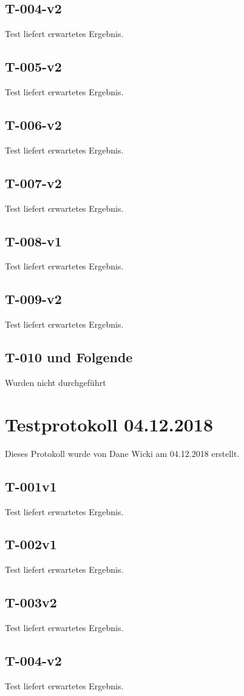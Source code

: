\documentclass[a4paper]{scrreprt}
\begin{document}
\subsection{T-004-v2}
Test liefert erwartetes Ergebnis.
\subsection{T-005-v2}
Test liefert erwartetes Ergebnis.
\subsection{T-006-v2}
Test liefert erwartetes Ergebnis.
\subsection{T-007-v2}
Test liefert erwartetes Ergebnis.
\subsection{T-008-v1}
Test liefert erwartetes Ergebnis.
\subsection{T-009-v2}
Test liefert erwartetes Ergebnis.
\subsection{T-010 und Folgende}
Wurden nicht durchgeführt
\section{Testprotokoll 04.12.2018}
Dieses Protokoll wurde von Dane Wicki am 04.12.2018 erstellt.
\subsection{T-001v1}
Test liefert erwartetes Ergebnis.
\subsection{T-002v1}
Test liefert erwartetes Ergebnis.
\subsection{T-003v2}
Test liefert erwartetes Ergebnis.
\subsection{T-004-v2}
Test liefert erwartetes Ergebnis.
\end{document}

